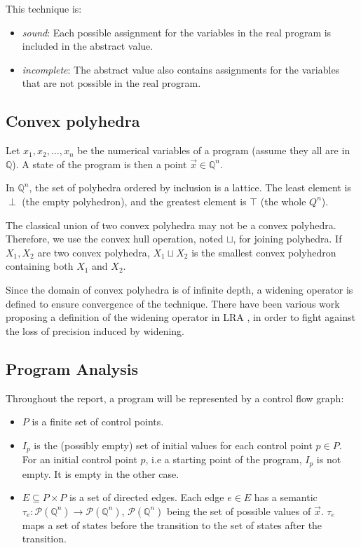 \documentclass[a4paper,english,titlepage,11pt]{report}
\def\Q{\mathbb{Q}}
\def\P{\mathcal{P}}
\begin{document}
This technique is:
\begin{itemize}
\item \emph{sound}: Each possible assignment for the variables in the real
program is included in the abstract value.
\item \emph{incomplete}: The abstract value also contains assignments for the
variables that are not possible in the real program.
\end{itemize}

\subsection{Convex polyhedra}

Let $x_1, x_2, \dots ,x_n$ be the numerical variables of a program (assume they
all are in $\Q$). A state of
the program is then a point $\overrightarrow{x} \in \Q^n$.

In $\Q^n$, the set of polyhedra ordered by inclusion is a lattice. The least element is $\perp$
(the empty polyhedron), and the greatest element is $\top$ (the whole $Q^n$).

The classical union of two convex polyhedra may not be a convex polyhedra.
Therefore, we use the convex hull operation, noted $\sqcup$, for joining
polyhedra. 
If $X_1, X_2$ are two convex polyhedra, $X_1 \sqcup X_2$ is the
smallest convex polyhedron containing both $X_1$ and $X_2$.

Since the domain of convex polyhedra is of infinite depth, a widening operator
is defined to ensure convergence of the technique. There have been various
work proposing a definition of the widening operator in LRA
\cite{CH78,Hal79,HPR97,BlanchetCousotEtAl_PLDI03}, in order to fight
against the loss of precision induced by widening.

\subsection{Program Analysis}

Throughout the report, a program will be represented by a control flow graph:
\begin{itemize}
\item $P$ is a finite set of control points.
\item $I_p$ is the (possibly empty)
set of initial values for each control point $p \in P$. For an initial control
point $p$, i.e a starting point of the program, $I_p$ is not empty. It is empty
in the other case.
\item $E \subseteq  P \times P$ is a set of directed edges. Each edge $e \in E$
has a semantic $\tau_e: \P(\Q^n) \rightarrow \P(\Q^n)$, $\P(\Q^n)$ being the set
of possible values of $\overrightarrow{x}$. $\tau_e$ maps a set of states before
the transition to the set of states after the transition.
\end{itemize}
\end{document}
